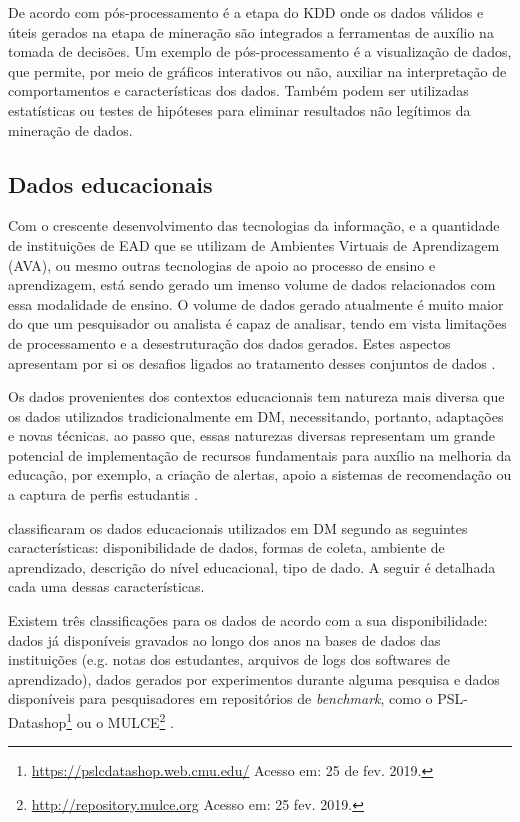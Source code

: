 De acordo com  pós-processamento é a etapa do KDD
onde os dados válidos e úteis gerados na etapa de mineração são integrados a
ferramentas de auxílio na tomada de decisões. Um exemplo de pós-processamento é
a visualização de dados, que permite, por meio de gráficos interativos ou não,
auxiliar na interpretação de comportamentos e características dos dados. Também
podem ser utilizadas estatísticas ou testes de hipóteses para eliminar
resultados não legítimos da mineração de dados.

\subsection{Dados educacionais}

Com o crescente desenvolvimento das tecnologias da informação, e a quantidade de
instituições de EAD que se utilizam de Ambientes Virtuais de Aprendizagem (AVA),
ou mesmo outras tecnologias de apoio ao processo de ensino e aprendizagem, está
sendo gerado um imenso volume de dados relacionados com essa modalidade de
ensino. O volume de dados gerado atualmente é muito maior do que um pesquisador
ou analista  é capaz de analisar, tendo em vista limitações de processamento e a
desestruturação dos dados gerados. Estes aspectos apresentam por si os desafios
ligados ao tratamento desses conjuntos de dados
\cite{rigo2014aplicaccoes,costa2012mineraccao}.

Os dados provenientes dos contextos educacionais tem natureza mais diversa que
os dados utilizados tradicionalmente em DM, necessitando, portanto, adaptações e
novas técnicas. ao passo que, essas naturezas diversas representam um grande
potencial de implementação de recursos fundamentais para auxílio na melhoria da
educação, por exemplo, a criação de alertas, apoio a sistemas de recomendação ou
a captura de perfis estudantis \cite{rigo2014aplicaccoes}.

 classificaram os dados educacionais
utilizados em DM segundo as seguintes características: disponibilidade de dados,
formas de coleta, ambiente de aprendizado, descrição do nível educacional, tipo
de dado. A seguir é detalhada cada uma dessas características.

Existem três classificações para os dados de acordo com a sua disponibilidade:
dados já disponíveis gravados ao longo dos anos na bases de dados das
instituições (e.g. notas dos estudantes, arquivos de logs dos softwares de
aprendizado), dados gerados por experimentos durante alguma pesquisa e dados
disponíveis para pesquisadores em repositórios de \textit{benchmark}, como o
PSL-Datashop\footnote{\url{https://pslcdatashop.web.cmu.edu/} Acesso em: 25 de
fev. 2019.} ou o MULCE\footnote{\url{http://repository.mulce.org} Acesso em: 25
fev. 2019.} \cite{bousbia2014contribution}.

